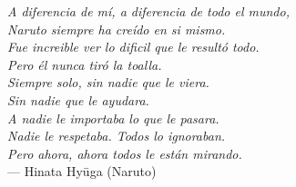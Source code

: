 \label{chap:anexos}


\begin{flushright}{\slshape
  A diferencia de mí, a diferencia de todo el mundo, \\ Naruto siempre ha creído en si mismo. \\ Fue increible ver lo dificil que le resultó todo. \\ Pero él nunca tiró la toalla. \\ Siempre solo, sin nadie que le viera. \\ Sin nadie que le ayudara. \\ A nadie le importaba lo que le pasara. \\ Nadie le respetaba. Todos lo ignoraban. \\  Pero ahora, ahora todos le están mirando.  } \\ \medskip
    --- {Hinata Hy\=uga (Naruto)}
\end{flushright}

	\medskip	

\vfill  
\minitoc\mtcskip

\clearpage
\clearpage
\clearpage
\clearpage
\clearpage
\clearpage
\clearpage
\clearpage
\clearpage


 \printglossary[title={Lista de t\'erminos},toctitle={Listado de t\'erminos}]
